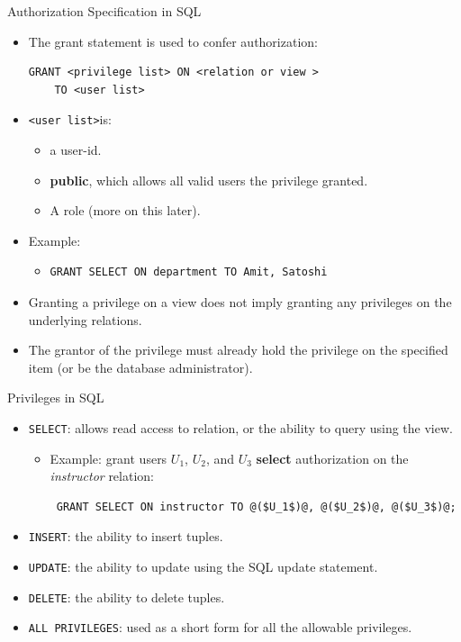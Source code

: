 \documentclass{beamer}
\begin{document}
\begin{frame}[fragile]{Authorization Specification in SQL}
    \begin{itemize}
        \item The grant statement is used to confer authorization:
            \begin{verbatim}
GRANT <privilege list> ON <relation or view >
    TO <user list>
            \end{verbatim}
        \item \verb|<user list>|is:
            \begin{itemize}
                \item a user-id.
                \item \textbf{public}, which allows all valid users the privilege granted.
                \item A role (more on this later).
            \end{itemize}
        \item Example:
            \begin{itemize}
                \item
                \begin{verbatim}
GRANT SELECT ON department TO Amit, Satoshi
                \end{verbatim}
            \end{itemize}
        \item Granting a privilege on a view does not imply granting any privileges on the underlying relations.
        \item The grantor of the privilege must already hold the privilege on the specified item (or be the database administrator).
    \end{itemize}
\end{frame}

\begin{frame}[fragile]{Privileges in SQL}
    \begin{itemize}
        \item \texttt{SELECT}: allows read access to relation, or the ability to query using the view.
            \begin{itemize}
                \item Example: grant users $U_1$, $U_2$, and $U_3$ \textbf{select} authorization on the \textit{instructor} relation:
                    \begin{lstlisting}
 GRANT SELECT ON instructor TO @($U_1$)@, @($U_2$)@, @($U_3$)@;
                    \end{lstlisting}
            \end{itemize}
        \item \texttt{INSERT}: the ability to insert tuples.
        \item \texttt{UPDATE}: the ability to update using the SQL update statement.
        \item \texttt{DELETE}: the ability to delete tuples.
        \item \texttt{ALL PRIVILEGES}: used as a short form for all the allowable privileges.
    \end{itemize}
\end{frame}
\end{document}
